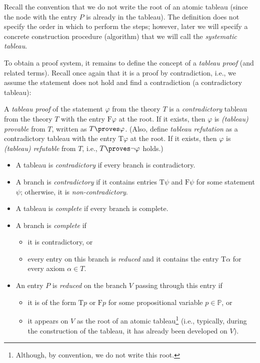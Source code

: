 Recall the convention that we do not write the root of an atomic tableau (since the node with the entry $P$ is already in the tableau). The definition does not specify the order in which to perform the steps; however, later we will specify a concrete construction procedure (algorithm) that we will call the \emph{systematic tableau}.

To obtain a proof system, it remains to define the concept of a \emph{tableau proof} (and related terms). Recall once again that it is a proof by contradiction, i.e., we assume the statement does not hold and find a contradiction (a contradictory tableau):

\begin{definition}
A \emph{tableau proof} of the statement $\varphi$ from the theory $T$ is a \emph{contradictory} tableau from the theory $T$ with the entry $\mathrm{F}\varphi$ at the root. If it exists, then $\varphi$ is \emph{(tableau) provable} from $T$, written as $T \proves \varphi$. (Also, define \emph{tableau refutation} as a contradictory tableau with the entry $\mathrm{T}\varphi$ at the root. If it exists, then $\varphi$ is \emph{(tableau) refutable} from $T$, i.e., $T \proves \neg \varphi$ holds.)
\begin{itemize}
    \item A tableau is \emph{contradictory} if every branch is contradictory.
    \item A branch is \emph{contradictory} if it contains entries $\mathrm{T}\psi$ and $\mathrm{F}\psi$ for some statement $\psi$; otherwise, it is \emph{non-contradictory}.
    \item A tableau is \emph{complete} if every branch is complete.
    \item A branch is \emph{complete} if 
    \begin{itemize}
        \item it is contradictory, or
        \item every entry on this branch is \emph{reduced} and it contains the entry $\mathrm{T}\alpha$ for every axiom $\alpha \in T$.
    \end{itemize}
     
    \item An entry $P$ is \emph{reduced} on the branch $V$ passing through this entry if 
    \begin{itemize}
        \item it is of the form $\mathrm{T}p$ or $\mathrm{F}p$ for some propositional variable $p \in \mathbb{P}$, or
        \item it appears on $V$ as the root of an atomic tableau\footnote{Although, by convention, we do not write this root.} (i.e., typically, during the construction of the tableau, it has already been developed on $V$).
    \end{itemize}
\end{itemize}
\end{definition}

